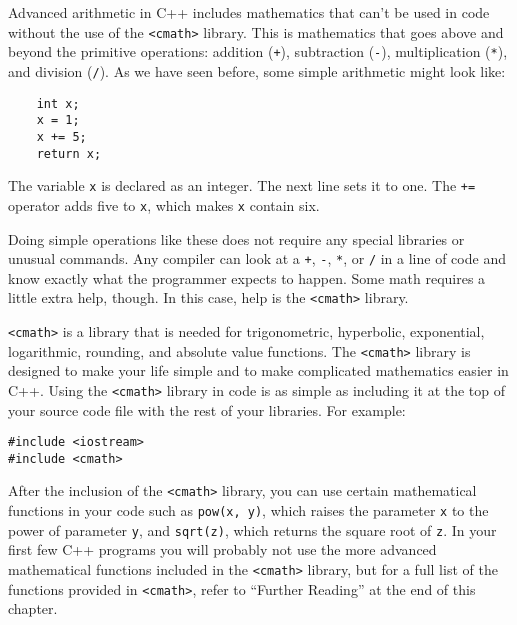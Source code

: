 Advanced arithmetic in C++ includes mathematics that can't be used in code 
without the use of the \texttt{<cmath>} library. 
This is mathematics that goes above and beyond the primitive operations: 
addition (\texttt{+}), subtraction (\texttt{-}), multiplication (\texttt{*}), 
and division (\texttt{/}). 
As we have seen before, some simple arithmetic might look like:
	
\begin{lstlisting}
	int x;
	x = 1;
	x += 5;
	return x;
\end{lstlisting}
	The variable \texttt{x} is declared as an integer. 
	The next line sets it to one. 
	The \texttt{+=} operator adds five to \texttt{x}, which makes \texttt{x} contain six.
	

Doing simple operations like these does not require any special libraries or 
unusual commands. Any compiler can look at a \texttt{+}, \texttt{-}, 
\texttt{*}, or \texttt{/} in a line of code and know exactly what the programmer 
expects to happen. Some math requires a little extra help, though. In this case, 
help is the \texttt{<cmath>} library.
 
\texttt{<cmath>} is a library that is needed for trigonometric, hyperbolic, 
exponential, logarithmic, rounding, and absolute value functions. 
	The \texttt{<cmath>} library is designed to make your life simple and to 
make complicated mathematics easier in C++. 
	Using the \texttt{<cmath>} library in code is as simple as including it at 
the top of your source code file with the rest of your libraries. For example:

\begin{lstlisting}
#include <iostream>	
#include <cmath>
\end{lstlisting}

	After the inclusion of the \texttt{<cmath>} library, you can use certain 
mathematical functions in your code such as \texttt{pow(x, y)}, which raises 
the parameter \texttt{x} to the power of parameter \texttt{y}, and 
\texttt{sqrt(z)}, which returns the square root of \texttt{z}. 
	In your first few C++ programs you will probably not use the more advanced 
mathematical functions included in the \texttt{<cmath>} library, but for a full 
list of the functions provided in \texttt{<cmath>}, refer to ``Further Reading'' 
at the end of this chapter. 

